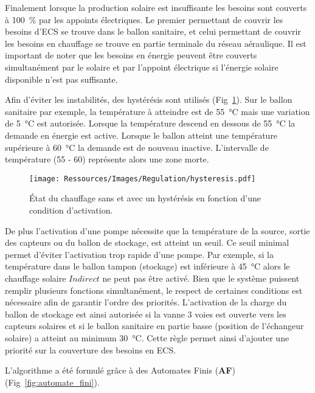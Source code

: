 Finalement lorsque la production solaire est insuffisante les besoins sont couverts à
\SI{100}{\percent} par les appoints électriques. Le premier permettant de couvrir les
besoins d’ECS se trouve dans le ballon sanitaire, et celui permettant de couvrir les
besoins en chauffage se trouve en partie terminale du réseau aéraulique. Il est important
de noter que les besoins en énergie peuvent être couverts simultanément par
le solaire et par l’appoint électrique si l’énergie solaire disponible n’est pas
suffisante.

Afin d’éviter les instabilités, des hystérésis sont utilisés (Fig~\ref{fig:hysteresis}). Sur le ballon sanitaire par
exemple, la température à atteindre est de \SI{55}{\celsius} mais une variation de
\SI{5}{\celsius} est autorisée. Lorsque la température descend en dessous de
\SI{55}{\celsius} la demande en énergie est active. Lorsque le ballon atteint une
température supérieure à \SI{60}{\celsius} la demande est de nouveau inactive.
L’intervalle de température (55 - 60) représente alors une zone morte.
\begin{figure}
    \begin{center}
        \texttt{[image: Ressources/Images/Regulation/hysteresis.pdf]}
    \end{center}
    \caption{État du chauffage sans et avec un hystérésis en fonction d’une condition
             d’activation.
             \label{fig:hysteresis}}
\end{figure}

De plus l’activation d’une pompe nécessite que la température de la source, sortie des
capteurs ou du ballon de stockage, est atteint un seuil. Ce seuil minimal permet d’éviter
l’activation trop rapide d’une pompe. Par exemple, si la température dans le ballon tampon
(stockage) est inférieure à \SI{45}{\celsius} alors le chauffage solaire $Indirect$ ne
peut pas être activé. Bien que le système puissent remplir plusieurs fonctions
simultanément, le respect de certaines conditions est nécessaire afin de garantir l’ordre
des priorités. L’activation de la charge du ballon de stockage est ainsi autorisée si la
vanne 3 voies est ouverte vers les capteurs solaires et si le ballon sanitaire en partie
basse (position de l’échangeur solaire) a atteint au minimum \SI{30}{\celsius}. Cette
règle permet ainsi d’ajouter une priorité sur la couverture des besoins en ECS.

L’algorithme a été formulé grâce à des Automates Finis (\textbf{AF}) (Fig~\ref{fig:automate_fini}).

